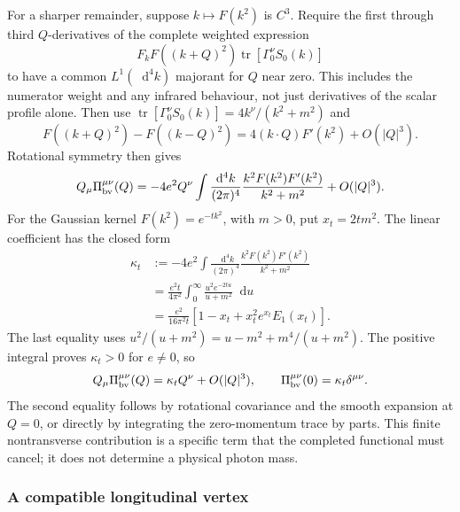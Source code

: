 \documentclass[final,5p,times,twocolumn,numbers,nopreprintline]{elsarticle}
\numberwithin{equation}{section}
\theoremstyle{definition}
\theoremstyle{remark}
\newcommand{\dd}{\mathop{}\!\mathrm d}
\newcommand{\Tr}{\operatorname{tr}}
\begin{document}
For a sharper remainder, suppose \(k\mapsto F(k^2)\) is \(C^3\).
Require the first through third \(Q\)-derivatives of the complete
weighted expression
\[
 F_k F((k+Q)^2)\Tr[\Gamma_0^\nu S_0(k)]
\]
to have a common \(L^1(\dd^4k)\) majorant for \(Q\) near zero.
This includes the numerator weight and any infrared behaviour, not
just derivatives of the scalar profile alone. Then use
\(\Tr[\Gamma_0^\nu S_0(k)]=4k^\nu/(k^2+m^2)\) and
\[
 F((k+Q)^2)-F((k-Q)^2)
       =4(k\cdot Q)F'(k^2)+O(|Q|^3).
\]
Rotational symmetry then gives
\begin{equation}
 Q_\mu\Pi_{\rm bv}^{\mu\nu}(Q)
 =-4e^2Q^\nu
   \int\frac{\dd^4k}{(2\pi)^4}
       \frac{k^2F(k^2)F'(k^2)}{k^2+m^2}
       +O(|Q|^3).
 \label{eq:Ward-smallQ}
\end{equation}
For the Gaussian kernel \(F(k^2)=e^{-tk^2}\), with \(m>0\),
put \(x_t=2tm^2\). The linear coefficient has the closed form
\begin{align}
 \kappa_t
 &:=-4e^2\int\frac{\dd^4k}{(2\pi)^4}
       \frac{k^2F(k^2)F'(k^2)}{k^2+m^2} \nonumber\\
 &=\frac{e^2t}{4\pi^2}\int_0^\infty
       \frac{u^2e^{-2tu}}{u+m^2}\dd u \nonumber\\
 &=\frac{e^2}{16\pi^2t}
       \left[1-x_t+x_t^2e^{x_t}E_1(x_t)\right].
 \label{eq:gaussian-Ward-coefficient}
\end{align}
The last equality uses
\(u^2/(u+m^2)=u-m^2+m^4/(u+m^2)\).
The positive integral proves \(\kappa_t>0\) for \(e\neq0\), so
\begin{equation}
 Q_\mu\Pi_{\rm bv}^{\mu\nu}(Q)
       =\kappa_tQ^\nu+O(|Q|^3),\qquad
 \Pi_{\rm bv}^{\mu\nu}(0)=\kappa_t\delta^{\mu\nu}.
 \label{eq:gaussian-Ward-violation}
\end{equation}
The second equality follows by rotational covariance and the smooth
expansion at \(Q=0\), or directly by integrating the zero-momentum
trace by parts. This finite nontransverse contribution is a specific
term that the completed functional must cancel; it does not determine
a physical photon mass.

\subsubsection*{A compatible longitudinal vertex}
\end{document}
